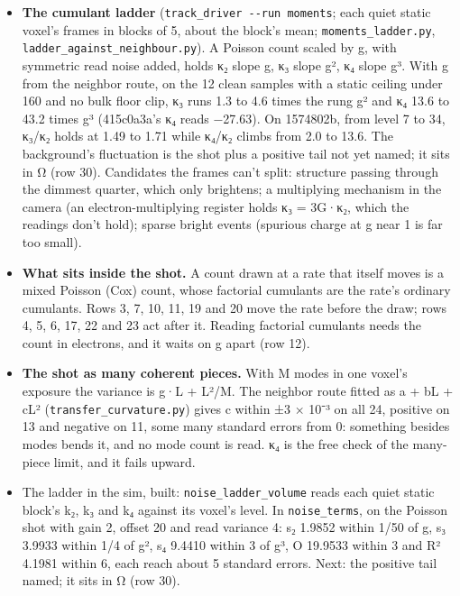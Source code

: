 \begin{enumerate}
\begin{itemize}
\item \textbf{The cumulant ladder} (\texttt{track\_\allowbreak{}driver -\allowbreak{}-\allowbreak{}run moments}; each quiet static voxel's frames in blocks of 5, about the block's mean; \texttt{moments\_\allowbreak{}ladder.\allowbreak{}py}, \texttt{ladder\_\allowbreak{}against\_\allowbreak{}neighbour.\allowbreak{}py}). A Poisson count scaled by g, with symmetric read noise added, holds κ₂ slope g, κ₃ slope g², κ₄ slope g³. With g from the neighbor route, on the 12 clean samples with a static ceiling under 160 and no bulk floor clip, κ₃ runs 1.3 to 4.6 times the rung g² and κ₄ 13.6 to 43.2 times g³ (415c0a3a's κ₄ reads −27.63). On 1574802b, from level 7 to 34, κ₃/κ₂ holds at 1.49 to 1.71 while κ₄/κ₂ climbs from 2.0 to 13.6. The background's fluctuation is the shot plus a positive tail not yet named; it sits in Ω (row 30). Candidates the frames can't split: structure passing through the dimmest quarter, which only brightens; a multiplying mechanism in the camera (an electron-multiplying register holds κ₃ = 3G·κ₂, which the readings don't hold); sparse bright events (spurious charge at g near 1 is far too small).
\item \textbf{What sits inside the shot.} A count drawn at a rate that itself moves is a mixed Poisson (Cox) count, whose factorial cumulants are the rate's ordinary cumulants. Rows 3, 7, 10, 11, 19 and 20 move the rate before the draw; rows 4, 5, 6, 17, 22 and 23 act after it. Reading factorial cumulants needs the count in electrons, and it waits on g apart (row 12).
\item \textbf{The shot as many coherent pieces.} With M modes in one voxel's exposure the variance is g·L + L²/M. The neighbor route fitted as a + bL + cL² (\texttt{transfer\_\allowbreak{}curvature.\allowbreak{}py}) gives c within ±3 × 10⁻³ on all 24, positive on 13 and negative on 11, some many standard errors from 0: something besides modes bends it, and no mode count is read. κ₄ is the free check of the many-piece limit, and it fails upward.
\item The ladder in the sim, built: \texttt{noise\_\allowbreak{}ladder\_\allowbreak{}volume} reads each quiet static block's k₂, k₃ and k₄ against its voxel's level. In \texttt{noise\_\allowbreak{}terms}, on the Poisson shot with gain 2, offset 20 and read variance 4: s₂ 1.9852 within 1/50 of g, s₃ 3.9933 within 1/4 of g², s₄ 9.4410 within 3 of g³, O 19.9533 within 3 and R² 4.1981 within 6, each reach about 5 standard errors. Next: the positive tail named; it sits in Ω (row 30).

\end{itemize}
\end{enumerate}

